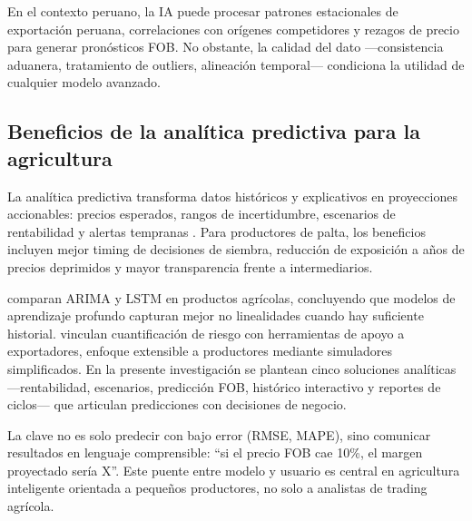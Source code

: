 En el contexto peruano, la IA puede procesar patrones estacionales de exportaci\'on peruana, correlaciones con or\'igenes competidores y rezagos de precio para generar pron\'osticos FOB. No obstante, la calidad del dato ---consistencia aduanera, tratamiento de outliers, alineaci\'on temporal--- condiciona la utilidad de cualquier modelo avanzado.

\subsection{Beneficios de la anal\'itica predictiva para la agricultura}

La anal\'itica predictiva transforma datos hist\'oricos y explicativos en proyecciones accionables: precios esperados, rangos de incertidumbre, escenarios de rentabilidad y alertas tempranas \citep{Theofilou2025, Xia2024}. Para productores de palta, los beneficios incluyen mejor timing de decisiones de siembra, reducci\'on de exposici\'on a a\~nos de precios deprimidos y mayor transparencia frente a intermediarios.

\citet{Xia2024} comparan ARIMA y LSTM en productos agr\'icolas, concluyendo que modelos de aprendizaje profundo capturan mejor no linealidades cuando hay suficiente historial. \citet{Velasquez2025} vinculan cuantificaci\'on de riesgo con herramientas de apoyo a exportadores, enfoque extensible a productores mediante simuladores simplificados. En la presente investigaci\'on se plantean cinco soluciones anal\'iticas ---rentabilidad, escenarios, predicci\'on FOB, hist\'orico interactivo y reportes de ciclos--- que articulan predicciones con decisiones de negocio.

La clave no es solo predecir con bajo error (RMSE, MAPE), sino comunicar resultados en lenguaje comprensible: ``si el precio FOB cae 10\%, el margen proyectado ser\'ia X''. Este puente entre modelo y usuario es central en agricultura inteligente orientada a peque\~nos productores, no solo a analistas de trading agr\'icola.
